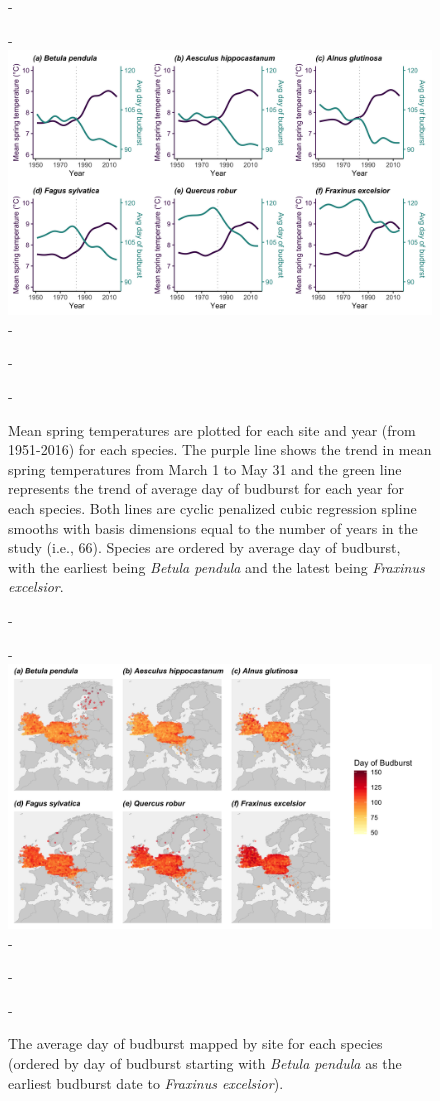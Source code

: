 \documentclass{article}\usepackage[]{graphicx}\usepackage[]{color}
\begin{document}
{\begin{figure} [H]
  -\begin{center}
  -\includegraphics[width=16cm]{..//..//analyses/figures/mstbb_byspp_lines.png}
  -\caption{Mean spring temperatures are plotted for each site and year (from 1951-2016) for each species. The purple line shows the trend in mean spring temperatures from March 1 to May 31 and the green line represents the trend of average day of budburst for each year for each species. Both lines are cyclic penalized cubic regression spline smooths with basis dimensions equal to the number of years in the study (i.e., 66). Species are ordered by average day of budburst, with the earliest being \textit{Betula pendula} and the latest being \textit{Fraxinus excelsior}. }\label{fig:mst}
  -\end{center}
  -\end{figure}}

{\begin{figure} [H]
  -\begin{center}
  -\includegraphics[width=14cm]{..//..//analyses/figures/bb_base.png}
  -\caption{The average day of budburst mapped by site for each species (ordered by day of budburst starting with \textit{Betula pendula} as the earliest budburst date to \textit{Fraxinus excelsior}). }\label{fig:bbmap}
  -\end{center}
  -\end{figure}}
  
\end{document}
